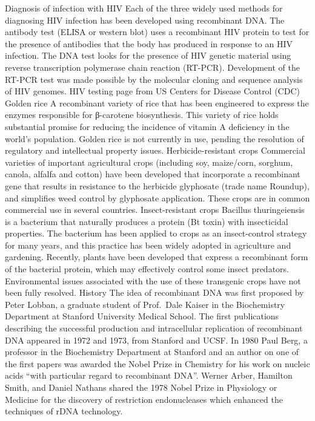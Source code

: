 Diagnosis of infection with HIV
Each of the three widely used methods for diagnosing HIV infection has been developed using recombinant DNA. The antibody test (ELISA or western blot) uses a recombinant HIV protein to test for the presence of antibodies that the body has produced in response to an HIV infection. The DNA test looks for the presence of HIV genetic material using reverse transcription polymerase chain reaction (RT-PCR). Development of the RT-PCR test was made possible by the molecular cloning and sequence analysis of HIV genomes. HIV testing page from US Centers for Disease Control (CDC)
Golden rice
A recombinant variety of rice that has been engineered to express the enzymes responsible for β-carotene biosynthesis. This variety of rice holds substantial promise for reducing the incidence of vitamin A deficiency in the world's population. Golden rice is not currently in use, pending the resolution of regulatory and intellectual property issues.
Herbicide-resistant crops
Commercial varieties of important agricultural crops (including soy, maize/corn, sorghum, canola, alfalfa and cotton) have been developed that incorporate a recombinant gene that results in resistance to the herbicide glyphosate (trade name Roundup), and simplifies weed control by glyphosate application. These crops are in common commercial use in several countries.
Insect-resistant crops
Bacillus thuringeiensis is a bacterium that naturally produces a protein (Bt toxin) with insecticidal properties. The bacterium has been applied to crops as an insect-control strategy for many years, and this practice has been widely adopted in agriculture and gardening. Recently, plants have been developed that express a recombinant form of the bacterial protein, which may effectively control some insect predators. Environmental issues associated with the use of these transgenic crops have not been fully resolved.
History
The idea of recombinant DNA was first proposed by Peter Lobban, a graduate student of Prof.~Dale Kaiser in the Biochemistry Department at Stanford University Medical School. The first publications describing the successful production and intracellular replication of recombinant DNA appeared in 1972 and 1973, from Stanford and UCSF. In 1980 Paul Berg, a professor in the Biochemistry Department at Stanford and an author on one of the first papers was awarded the Nobel Prize in Chemistry for his work on nucleic acids ``with particular regard to recombinant DNA''. Werner Arber, Hamilton Smith, and Daniel Nathans shared the 1978 Nobel Prize in Physiology or Medicine for the discovery of restriction endonucleases which enhanced the techniques of rDNA technology.

